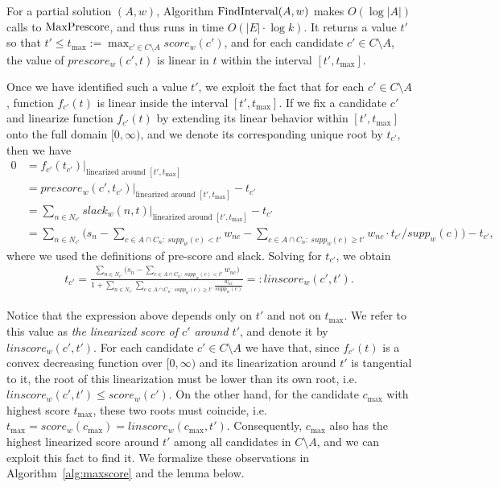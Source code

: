 \begin{lemma}
For a partial solution $(A,w)$, Algorithm $\operatorname{FindInterval}(A,w)$ makes $O(\log |A|)$ calls to $\operatorname{MaxPrescore}$, and thus runs in time $O(|E|\cdot \log k)$. It returns a value $t'$ so that $t'\leq t_{\max}:=\max_{c'\in C\setminus A} score_w(c')$, and for each candidate $c'\in C\setminus A$, the value of $prescore_w(c',t)$ is linear in $t$ within the interval $[t',t_{\max}]$.
\end{lemma}

Once we have identified such a value $t'$, we exploit the fact that for each $c'\in C\setminus A$, function $f_{c'}(t)$ is linear inside the interval $[t',t_{\max}]$. If we fix a candidate $c'$ and linearize function $f_{c'}(t)$ by extending its linear behavior within $[t', t_{\max}]$ onto the full domain $[0,\infty)$, and we denote its corresponding unique root by $t_{c'}$, then we have 
%
\begin{align*}
    0&= f_{c'}(t_{c'})|_{\text{linearized around } [t', t_{\max}]}\\
    &=prescore_w(c', t_{c'})|_{\text{linearized around } [t', t_{\max}]} - t_{c'}\\
    &=\sum_{n\in N_{c'}} slack_w(n,t)|_{\text{linearized around } [t', t_{\max}]} - t_{c'}\\
    &=\sum_{n\in N_{c'}} \Big( s_n - \sum_{c\in A\cap C_n: \ supp_{w}(c)< t'}w_{nc} - \sum_{c\in A\cap C_n: \ supp_w(c)\geq t'} w_{nc}\cdot t_{c'}/supp_w(c) \Big) - t_{c'},
\end{align*}
%
where we used the definitions of pre-score and slack. Solving for $t_{c'}$, we obtain
%
\begin{align*}
    t_{c'}=\frac{\sum_{n\in N_{c'}} \Big( s_n - \sum_{c\in A\cap C_n: \ supp_w(c)< t'} w_{nc} \Big)}%
    {1+\sum_{n\in N_{c'}} \sum_{c\in A\cap C_n: \ supp_w(c)\geq t'} \frac{w_{nc}}{supp_w(c)}}=:linscore_w(c',t').
\end{align*}

Notice that the expression above depends only on $t'$ and not on $t_{\max}$. We refer to this value as \emph{the linearized score of $c'$ around $t'$}, and denote it by $linscore_w(c',t')$. For each candidate $c'\in C\setminus A$ we have that, since $f_{c'}(t)$ is a convex decreasing function over $[0,\infty)$ and its linearization around $t'$ is tangential to it, the root of this linearization must be lower than its own root, i.e. $linscore_w(c',t')\leq score_w(c')$. 
On the other hand, for the candidate $c_{\max}$ with highest score $t_{\max}$, these two roots must coincide, i.e. $t_{\max}=score_w(c_{\max})=linscore_w(c_{\max}, t')$. Consequently, $c_{\max}$ also has the highest linearized score around $t'$ among all candidates in $C\setminus A$, and we can exploit this fact to find it. We formalize these observations in Algorithm~\ref{alg:maxscore} and the lemma below.

